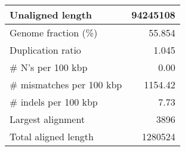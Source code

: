 \documentclass[12pt,a4paper]{article}
\begin{document}
\begin{table}[ht]
\begin{center}
\begin{tabular}{|l*{1}{|r}|}
Unaligned length & 94245108 \\ \hline
Genome fraction (\%) & 55.854 \\ \hline
Duplication ratio & 1.045 \\ \hline
\# N's per 100 kbp & 0.00 \\ \hline
\# mismatches per 100 kbp & 1154.42 \\ \hline
\# indels per 100 kbp & 7.73 \\ \hline
Largest alignment & 3896 \\ \hline
Total aligned length & 1280524 \\ \hline
\end{tabular}
\end{center}
\end{table}
\end{document}
